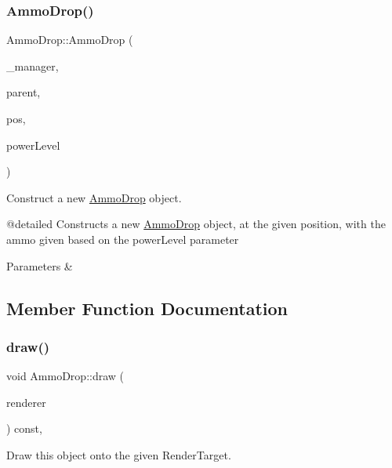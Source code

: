 \subsubsection{\texorpdfstring{AmmoDrop()}{AmmoDrop()}}
{\footnotesize\ttfamily Ammo\+Drop\+::\+Ammo\+Drop (\begin{DoxyParamCaption}\item[{\mbox{\hyperlink{class_game_manager}{Game\+Manager}} $\ast$}]{\+\_\+manager,  }\item[{\mbox{\hyperlink{class_game_entity}{Game\+Entity}} $\ast$}]{parent,  }\item[{\mbox{\hyperlink{classsf_1_1_vector2}{sf\+::\+Vector2f}}}]{pos,  }\item[{float}]{power\+Level }\end{DoxyParamCaption})}



Construct a new \mbox{\hyperlink{class_ammo_drop}{Ammo\+Drop}} object. 

@detailed Constructs a new \mbox{\hyperlink{class_ammo_drop}{Ammo\+Drop}} object, at the given position, with the ammo given based on the power\+Level parameter


\begin{DoxyParams}{Parameters}
{\em } & \\
\hline
\end{DoxyParams}


\subsection{Member Function Documentation}
\mbox{\label{class_ammo_drop_ab0c9da24a8f8c47b679705bed1b24cff}} 
\subsubsection{\texorpdfstring{draw()}{draw()}}
{\footnotesize\ttfamily void Ammo\+Drop\+::draw (\begin{DoxyParamCaption}\item[{\mbox{\hyperlink{classsf_1_1_render_target}{sf\+::\+Render\+Target}} \&}]{renderer }\end{DoxyParamCaption}) const\hspace{0.3cm}{\ttfamily [override]}, {\ttfamily [virtual]}}



Draw this object onto the given Render\+Target. 


